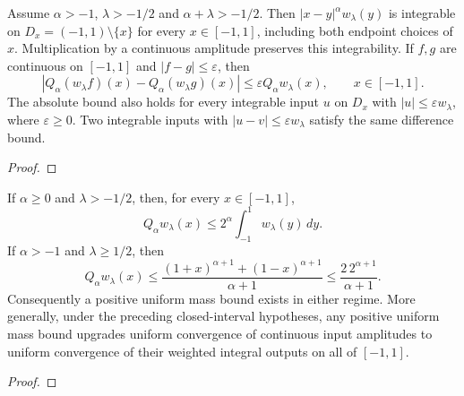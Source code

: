 \begin{supporting}
\begin{theorem}
\label{thm:power-law-closed-stability}
\leanok
Assume $\alpha>-1$, $\lambda>-1/2$ and $\alpha+\lambda>-1/2$.
Then $|x-y|^\alpha w_\lambda(y)$ is integrable on $D_x=(-1,1)\setminus\{x\}$ for every
$x\in[-1,1]$, including both endpoint choices of $x$. Multiplication by a continuous amplitude
preserves this integrability. If $f,g$ are continuous on $[-1,1]$ and
$|f-g|\le\varepsilon$, then
\[
 |Q_\alpha(w_\lambda f)(x)-Q_\alpha(w_\lambda g)(x)|
 \le\varepsilon Q_\alpha w_\lambda(x),\qquad x\in[-1,1].
\]
The absolute bound also holds for every integrable input $u$ on $D_x$
with $|u|\le\varepsilon w_\lambda$, where $\varepsilon\ge0$. Two integrable
inputs with $|u-v|\le\varepsilon w_\lambda$ satisfy the same difference bound.

\end{theorem}
\begin{proof}
\leanok
\end{proof}


\begin{theorem}
\label{thm:power-law-closed-mass}
\leanok
If $\alpha\ge0$ and $\lambda>-1/2$, then, for every $x\in[-1,1]$,
\[
 Q_\alpha w_\lambda(x)\le2^\alpha\int_{-1}^1w_\lambda(y)\,dy.
\]
If $\alpha>-1$ and $\lambda\ge1/2$, then
\[
 Q_\alpha w_\lambda(x)\le
 \frac{(1+x)^{\alpha+1}+(1-x)^{\alpha+1}}{\alpha+1}
 \le\frac{2\,2^{\alpha+1}}{\alpha+1}.
\]
Consequently a positive uniform mass bound exists in either regime.
More generally, under the preceding closed-interval hypotheses, any positive
uniform mass bound upgrades uniform convergence of continuous input amplitudes
to uniform convergence of their weighted integral outputs on all of $[-1,1]$.

\end{theorem}
\begin{proof}
\leanok
\end{proof}


\end{supporting}

